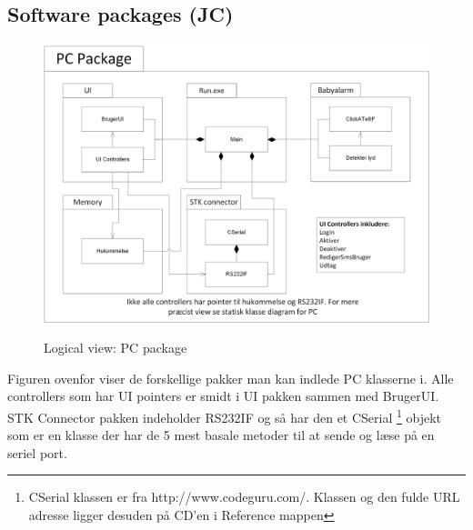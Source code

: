 \clearpage

\subsection{Software packages (JC)}

\begin{figure}[!htb]
     {\includegraphics[width=\textwidth]{billeder/uml/logical_view_pc}}
     \caption{Logical view: PC package}
     \label{fig:PC_package}
\end{figure}

Figuren ovenfor viser de forskellige pakker man kan indlede PC klasserne i. Alle controllers som har UI pointers er smidt i UI pakken sammen med BrugerUI. STK Connector pakken indeholder RS232IF og så har den et CSerial \footnote{CSerial klassen er fra http://www.codeguru.com/. Klassen og den fulde URL adresse ligger desuden på CD'en i Reference mappen} objekt som er en klasse der har de 5 mest basale metoder til at sende og læse på en seriel port.


\clearpage

